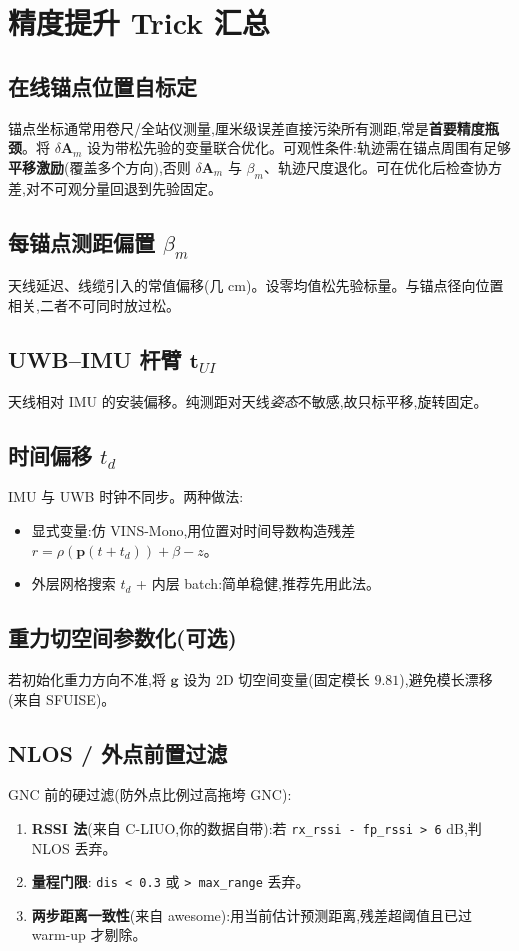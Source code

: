 \documentclass[11pt,a4paper]{report}
\newcommand{\bp}{\bm{p}}
\newcommand{\bg}{\bm{g}}
\newcommand{\bA}{\bm{A}}
\newcommand{\bt}{\bm{t}}
\begin{document}
\chapter{精度提升 Trick 汇总}

\section{在线锚点位置自标定}\label{sec:observ}
锚点坐标通常用卷尺/全站仪测量,厘米级误差直接污染所有测距,常是\textbf{首要精度瓶颈}。将 $\delta\bA_m$ 设为带松先验的变量联合优化。可观性条件:轨迹需在锚点周围有足够\textbf{平移激励}(覆盖多个方向),否则 $\delta\bA_m$ 与 $\beta_m$、轨迹尺度退化。可在优化后检查协方差,对不可观分量回退到先验固定。

\section[每锚点测距偏置 beta m]{每锚点测距偏置 $\beta_m$}
天线延迟、线缆引入的常值偏移(几 cm)。设零均值松先验标量。与锚点径向位置相关,二者不可同时放过松。

\section[UWB--IMU 杆臂 t UI]{UWB--IMU 杆臂 $\bt_{UI}$}
天线相对 IMU 的安装偏移。纯测距对天线\emph{姿态}不敏感,故只标平移,旋转固定。

\section[时间偏移 t d]{时间偏移 $t_d$}
IMU 与 UWB 时钟不同步。两种做法:
\begin{itemize}[leftmargin=2em]
  \item 显式变量:仿 VINS-Mono,用位置对时间导数构造残差 $r=\rho(\bp(t+t_d))+\beta-z$。
  \item 外层网格搜索 $t_d$ + 内层 batch:简单稳健,推荐先用此法。
\end{itemize}

\section{重力切空间参数化(可选)}\label{sec:gravity}
若初始化重力方向不准,将 $\bg$ 设为 2D 切空间变量(固定模长 $9.81$),避免模长漂移(来自 SFUISE)。

\section{NLOS / 外点前置过滤}
GNC 前的硬过滤(防外点比例过高拖垮 GNC):
\begin{enumerate}[leftmargin=2em]
  \item \textbf{RSSI 法}(来自 C-LIUO,你的数据自带):若 \texttt{rx\_rssi - fp\_rssi > 6} dB,判 NLOS 丢弃。
  \item \textbf{量程门限}: \texttt{dis < 0.3} 或 \texttt{> max\_range} 丢弃。
  \item \textbf{两步距离一致性}(来自 awesome):用当前估计预测距离,残差超阈值且已过 warm-up 才剔除。
\end{enumerate}
\end{document}
